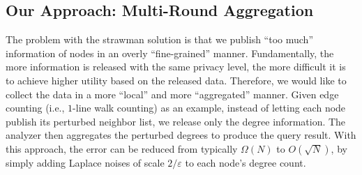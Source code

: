 \subsection{Our Approach: Multi-Round Aggregation}
\label{subsec:k-wk}



The problem with the strawman solution is that we publish ``too much'' information 
of nodes
in an overly ``fine-grained'' manner. 
Fundamentally, the more information is released with the same privacy level, the more difficult it is to achieve higher utility based on the released data.
Therefore, we would like to collect the data in a more ``local'' and more ``aggregated'' manner. 
Given edge counting (i.e., $1$-line walk counting) as an example, instead of letting each node publish its perturbed neighbor list, we release only the degree information.
The analyzer then aggregates the perturbed degrees to produce the query result.
With this approach, the error can be reduced from typically $\Omega(N)$
to $O(\sqrt{N})$, by simply adding Laplace noises of scale $2/\varepsilon$ to each node's degree count. 




\begin{algorithm}
\small
\caption{Local randomizer $\mathcal{R}^{(\ell)}$ of $\mathcal{M}_{\mathrm{k\text{-}wk}}$}
\label{alg:k-wk_randomizer}
\SetNoFillComment


\end{algorithm}






